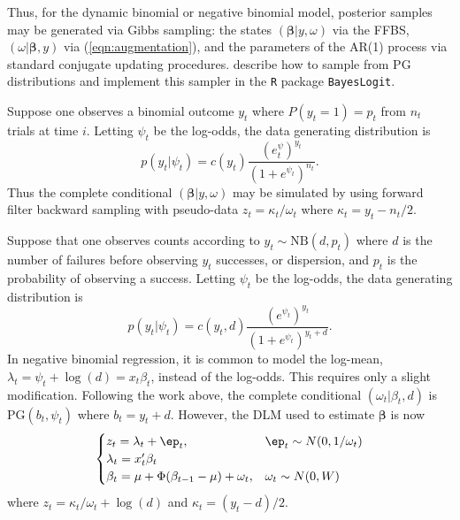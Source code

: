 \documentclass[12pt]{article}
\newcommand{\PG}{\text{PG}}
\newcommand{\NB}{\text{NB}}
\newcommand{\bbeta}{\boldsymbol{\beta}}
\begin{document}
Thus, for the dynamic binomial or negative binomial model, posterior samples may
be generated via Gibbs sampling: the states $(\bbeta| y, \omega)$ via the FFBS,
$(\omega | \bbeta, y)$ via (\ref{eqn:augmentation}), and the parameters of the
AR(1) process via standard conjugate updating procedures.
\cite{polson-etal-2012} describe how to sample from $\PG$ distributions and
implement this sampler in the \texttt{R} package \texttt{BayesLogit}.

\begin{example}
  Suppose one observes a binomial outcome $y_t$ where $P(y_t = 1) = p_t$ from
  $n_t$ trials at time $i$.  Letting $\psi_t$ be the log-odds, the data
  generating distribution is
\[
p(y_t | \psi_t) = c(y_t) \frac{(e^\psi_t)^{y_t}}{(1+e^{\psi_t})^{n_t}}.
\]
Thus the complete conditional $(\bbeta | y, \omega)$ may be simulated by using
forward filter backward sampling with pseudo-data $z_t = \kappa_t / \omega_t$
where $\kappa_t = y_t - n_t / 2$.
\end{example}


\begin{example}
  Suppose that one observes counts according to $y_t \sim \NB(d, p_t)$ where $d$
  is the number of failures before observing $y_t$ successes, or dispersion,
  and $p_t$ is the probability of observing a success.  Letting $\psi_t$ be the
  log-odds, the data generating distribution is
\[
p(y_t | \psi_t) = c(y_t, d) \frac{(e^{\psi_t})^{y_t}}{(1+e^{\psi_t})^{y_t+d}}.
\]
In negative binomial regression, it is common to model the log-mean, $\lambda_t
= \psi_t + \log(d) = x_t \beta_t$, instead of the log-odds.  This requires only
a slight modification.  Following the work above, the complete conditional
$(\omega_t | \beta_t, d)$ is $\PG(b_t, \psi_t)$ where $b_t = y_t + d$.  However,
the DLM used to estimate $\bbeta$ is now
\[
\begin{cases}
z_t = \lambda_t + \ep_t, & \ep_t \sim N(0, 1/\omega_t) \\
\lambda_t = x_t' \beta_t \\
\beta_t = \mu + \Phi (\beta_{t-1} - \mu) + \omega_t, & \omega_t \sim N(0, W)
\end{cases}
\]
where $z_t = \kappa_t / \omega_t + \log(d)$ and $\kappa_t = (y_t - d) / 2$.
\end{example}
\end{document}
